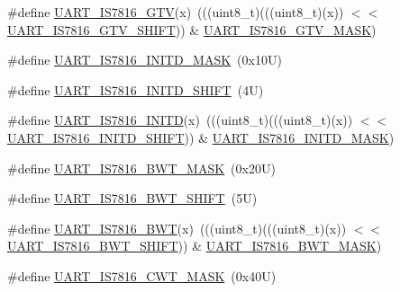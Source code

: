 \begin{DoxyCompactItemize}
\item 
\#define \mbox{\hyperlink{group___u_a_r_t___register___masks_ga5ab2b6e3feea53f32153dbca3f56dbc5}{U\+A\+R\+T\+\_\+\+I\+S7816\+\_\+\+G\+TV}}(x)~(((uint8\+\_\+t)(((uint8\+\_\+t)(x)) $<$$<$ \mbox{\hyperlink{group___u_a_r_t___register___masks_ga522eab69113bfd36e6f58835baa045a8}{U\+A\+R\+T\+\_\+\+I\+S7816\+\_\+\+G\+T\+V\+\_\+\+S\+H\+I\+FT}})) \& \mbox{\hyperlink{group___u_a_r_t___register___masks_ga863b3dbfbf807a29466c8acf12054673}{U\+A\+R\+T\+\_\+\+I\+S7816\+\_\+\+G\+T\+V\+\_\+\+M\+A\+SK}})
\item 
\#define \mbox{\hyperlink{group___u_a_r_t___register___masks_ga48d3ed5c444bdfed8d0baa49bd44d1c2}{U\+A\+R\+T\+\_\+\+I\+S7816\+\_\+\+I\+N\+I\+T\+D\+\_\+\+M\+A\+SK}}~(0x10\+U)
\item 
\#define \mbox{\hyperlink{group___u_a_r_t___register___masks_gaf36d718f5eb5c052b7670168d8b429b1}{U\+A\+R\+T\+\_\+\+I\+S7816\+\_\+\+I\+N\+I\+T\+D\+\_\+\+S\+H\+I\+FT}}~(4\+U)
\item 
\#define \mbox{\hyperlink{group___u_a_r_t___register___masks_ga6cb4bb7d090cf81948ed5b7b36dd4ca1}{U\+A\+R\+T\+\_\+\+I\+S7816\+\_\+\+I\+N\+I\+TD}}(x)~(((uint8\+\_\+t)(((uint8\+\_\+t)(x)) $<$$<$ \mbox{\hyperlink{group___u_a_r_t___register___masks_gaf36d718f5eb5c052b7670168d8b429b1}{U\+A\+R\+T\+\_\+\+I\+S7816\+\_\+\+I\+N\+I\+T\+D\+\_\+\+S\+H\+I\+FT}})) \& \mbox{\hyperlink{group___u_a_r_t___register___masks_ga48d3ed5c444bdfed8d0baa49bd44d1c2}{U\+A\+R\+T\+\_\+\+I\+S7816\+\_\+\+I\+N\+I\+T\+D\+\_\+\+M\+A\+SK}})
\item 
\#define \mbox{\hyperlink{group___u_a_r_t___register___masks_gab2edbcc850e211bdeadca83910170e5a}{U\+A\+R\+T\+\_\+\+I\+S7816\+\_\+\+B\+W\+T\+\_\+\+M\+A\+SK}}~(0x20\+U)
\item 
\#define \mbox{\hyperlink{group___u_a_r_t___register___masks_gab670b08a2ab5d4631892ca58eb447284}{U\+A\+R\+T\+\_\+\+I\+S7816\+\_\+\+B\+W\+T\+\_\+\+S\+H\+I\+FT}}~(5\+U)
\item 
\#define \mbox{\hyperlink{group___u_a_r_t___register___masks_gab6391c2de33ce9e7609bef16473015d3}{U\+A\+R\+T\+\_\+\+I\+S7816\+\_\+\+B\+WT}}(x)~(((uint8\+\_\+t)(((uint8\+\_\+t)(x)) $<$$<$ \mbox{\hyperlink{group___u_a_r_t___register___masks_gab670b08a2ab5d4631892ca58eb447284}{U\+A\+R\+T\+\_\+\+I\+S7816\+\_\+\+B\+W\+T\+\_\+\+S\+H\+I\+FT}})) \& \mbox{\hyperlink{group___u_a_r_t___register___masks_gab2edbcc850e211bdeadca83910170e5a}{U\+A\+R\+T\+\_\+\+I\+S7816\+\_\+\+B\+W\+T\+\_\+\+M\+A\+SK}})
\item 
\#define \mbox{\hyperlink{group___u_a_r_t___register___masks_gae20bf90aa36595094749fe075ce5cf0e}{U\+A\+R\+T\+\_\+\+I\+S7816\+\_\+\+C\+W\+T\+\_\+\+M\+A\+SK}}~(0x40\+U)
$$
\end{DoxyCompactItemize}
